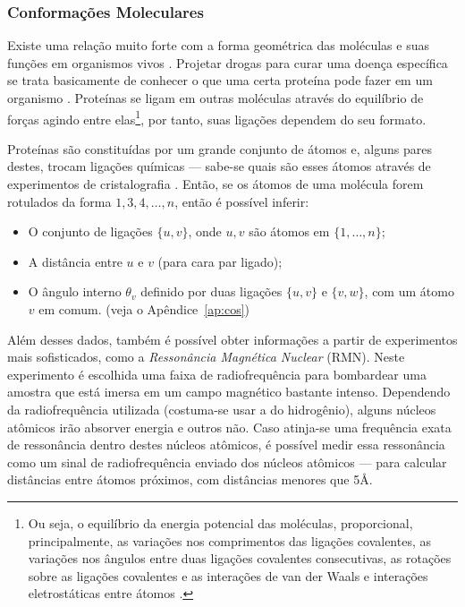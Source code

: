\documentclass[a4paper,12pt]{article}
\begin{document}
\subsubsection{Conformações Moleculares}

Existe uma relação muito forte com a forma geométrica das moléculas e suas funções em organismos vivos \cite{bioquimicaLehninger}. Projetar drogas para curar uma doença específica se trata basicamente de conhecer o que uma certa proteína pode fazer em um organismo \cite{libertiEDG}. Proteínas se ligam em outras moléculas através do equilíbrio de forças agindo entre elas\footnote{Ou seja, o equilíbrio da energia potencial das moléculas, proporcional, principalmente, as variações nos comprimentos das ligações covalentes, as variações nos ângulos entre duas ligações covalentes consecutivas, as rotações sobre as ligações covalentes e as interações de van der Waals e interações eletrostáticas entre átomos \cite{carlileTese}.}, por tanto, suas ligações dependem do seu formato. 

Proteínas são constituídas por um grande conjunto de átomos e, alguns pares destes, trocam ligações químicas --- sabe-se quais são esses átomos através de experimentos de cristalografia \cite{ramachandran1974MolStructure}. Então, se os átomos de uma molécula forem rotulados da forma $1,3,4,\dots,n$, então é possível inferir: 
\begin{itemize}
	\item O conjunto de ligações $\{u,v\}$, onde $u,v$ são átomos em $\{1,\dots,n\}$;
	\item A distância entre $u$ e $v$ (para cara par ligado);
	\item O ângulo interno $\theta_v$ definido por duas ligações $\{u,v\}$ e $\{v,w\}$, com um átomo $v$ em comum. (veja o Apêndice~\ref{ap:cos})
\end{itemize} 

Além desses dados, também é possível obter informações a partir de experimentos mais sofisticados, como a \textit{Ressonância Magnética Nuclear} (RMN). Neste experimento é escolhida uma faixa de radiofrequência para bombardear uma amostra que está imersa em um campo magnético bastante intenso. Dependendo da radiofrequência utilizada (costuma-se usar a do hidrogênio), alguns núcleos atômicos irão absorver energia e outros não. Caso atinja-se uma frequência exata de ressonância dentro destes núcleos atômicos, é possível medir essa ressonância como um sinal de radiofrequência enviado dos núcleos atômicos --- para calcular distâncias entre átomos próximos, com distâncias menores que 5\AA.
\end{document}
